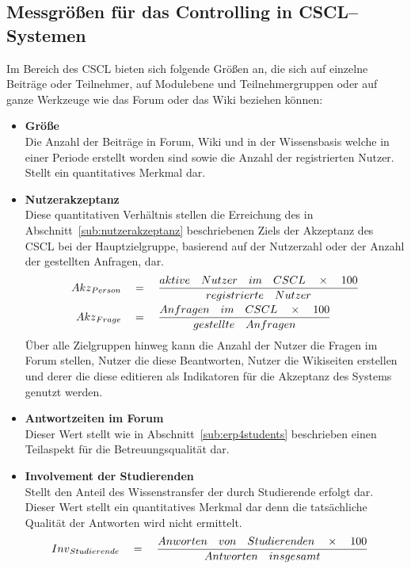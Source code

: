 \subsection{Messgrößen für das Controlling in CSCL–Systemen} %
\label{sub:messgrossen_fur_das_controlling_in_cscl_systemen}
Im Bereich des \ac{CSCL} bieten sich folgende Größen an, die sich auf einzelne Beiträge oder Teilnehmer, auf Modulebene und Teilnehmergruppen oder auf ganze Werkzeuge wie das Forum oder das Wiki beziehen können:

\begin{itemize}
	\item \textbf{Größe}\\ Die Anzahl der Beiträge in Forum, Wiki und in der Wissensbasis welche in einer Periode erstellt worden sind sowie die Anzahl der registrierten Nutzer. Stellt ein quantitatives Merkmal dar. 
	\item \textbf{Nutzerakzeptanz}\\ Diese 
	 quantitativen Verhältnis stellen die Erreichung des in Abschnitt~\ref{sub:nutzerakzeptanz} beschriebenen Ziels der Akzeptanz des \ac{CSCL} bei der Hauptzielgruppe, basierend auf der Nutzerzahl oder der Anzahl der gestellten Anfragen, dar.
\begin{align}
	 { Akz }_{ Person }\quad &=\quad \frac { aktive\quad Nutzer\quad im\quad CSCL\quad \times \quad 100 }{ registrierte\quad Nutzer } \notag \\
	 { Akz }_{ Frage }\quad &=\quad \frac { Anfragen\quad im\quad CSCL\quad \times \quad 100 }{ gestellte\quad Anfragen } \notag
\end{align}
Über alle Zielgruppen hinweg kann die Anzahl der Nutzer die Fragen im Forum stellen, Nutzer die diese Beantworten, Nutzer die Wikiseiten erstellen und derer die diese editieren als Indikatoren für die Akzeptanz des Systems genutzt werden.
	\item \textbf{Antwortzeiten im Forum}\\ Dieser Wert stellt wie in Abschnitt~\ref{sub:erp4students} beschrieben einen Teilaspekt für die Betreuungsqualität dar.
	\item \textbf{Involvement der Studierenden}\\ Stellt den Anteil des Wissenstransfer der durch Studierende erfolgt dar. Dieser Wert stellt ein quantitatives Merkmal dar denn die tatsächliche Qualität der Antworten wird nicht ermittelt.
\begin{align}
	 { Inv }_{ Studierende }\quad &=\quad \frac { Anworten\quad von\quad Studierenden\quad \times \quad 100 }{ Antworten \quad insgesamt } \notag

\end{align}
\end{itemize}

